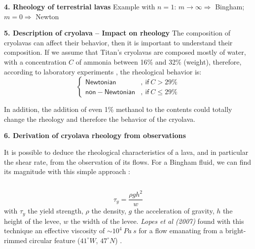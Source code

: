 \documentclass[final,t]{beamer}
\begin{document}
\begin{frame}
\begin{columns}[t]
\begin{column}{.495\linewidth}
\begin{block}{\textbf{4. Rheology of terrestrial lavas}}
  	Example with  $n=1$:
  	$m\rightarrow \infty \Rightarrow$ Bingham;
  	$m=0\Rightarrow$ Newton
  \end{block}
  
  \vspace{0.5cm}
  
  \begin{block}{\textbf{5. Description of cryolava -- Impact on rheology}}
  \rightskip=0pt\leftskip=0pt  
  The composition of cryolavas can affect their behavior, then it is important to understand their composition. If we assume that Titan's cryolavas are composed mostly of water, with a concentration $C$ of ammonia between 16\% and 32\% (weight), therefore, according to laboratory experiments \cite{kargel_1990}, the rheological behavior is:
  \begin{equation*}
  	\left\{
  	\begin{matrix}
  		\mathsf{Newtonian} & \mathsf{,\ if}\ C> 29\% \\
  		\mathsf{non-Newtonian} &\mathsf{,\ if}\  C \leq 29\% 
  	\end{matrix}
  	\right.
  \end{equation*}
  
  In addition, the addition of even 1\% methanol to the contents could totally change the rheology and therefore the behavior of the cryolava.
  
  
  

  
  \end{block}
  
    \vspace{0.5cm}
  \begin{block}{\textbf{6. Derivation of cryolava rheology from observations}} \rightskip=0pt\leftskip=0pt
  
  It is possible to deduce the rheological characteristics of a lava, and in particular the shear rate, from the observation of its flows. For a Bingham fluid, we can find its magnitude with this simple approach \cite{hulme_1974}:\vspace{-1cm}
  \begin{columns}
  \begin{column}{0.49\textwidth}\rightskip=0pt\leftskip=0pt
  \begin{equation}
  	\tau_y = \frac{\rho g h^2}{w}
  \end{equation}
  with $\tau_y$ the yield strength, $\rho$ the density, $g$ the acceleration of gravity, $h$ the height of the levee, $w$ the width of the levee. \emph{Lopes et al (2007)} \cite{Lopes2007} found with this technique an effective viscosity of $\sim 10^4\ Pa\ s$ for a flow emanating from a bright-rimmed circular feature ($41^\circ W$, $47^\circ N$) .
  

\end{column}
\end{columns}
\end{block}
\end{column}
\end{columns}
\end{frame}
\end{document}
